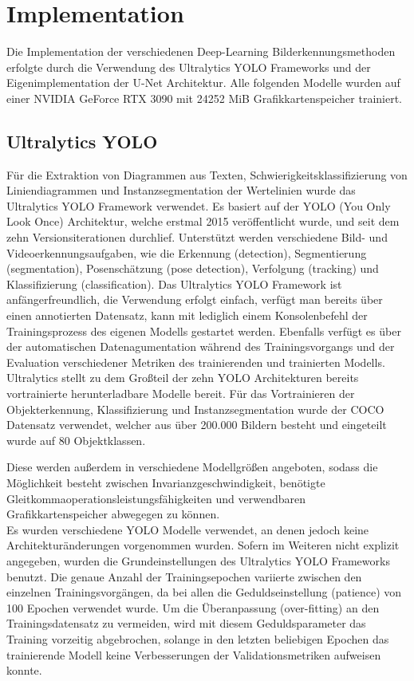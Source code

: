 \chapter{Implementation}
\label{ch:implementation}

Die Implementation der verschiedenen Deep-Learning Bilderkennungsmethoden erfolgte durch die Verwendung des Ultralytics YOLO \cite{Jocher_Ultralytics_YOLO_2023} Frameworks und der Eigenimplementation der U-Net \cite{ronneberger2015unetconvolutionalnetworksbiomedical} Architektur. Alle folgenden Modelle wurden auf einer NVIDIA GeForce RTX 3090 mit 24252 MiB Grafikkartenspeicher trainiert.

\section{Ultralytics YOLO}
Für die Extraktion von Diagrammen aus Texten, Schwierigkeitsklassifizierung von Liniendiagrammen und Instanzsegmentation der Wertelinien wurde das Ultralytics YOLO Framework verwendet. Es basiert auf der YOLO (You Only Look Once) Architektur, welche erstmal 2015 \cite{redmon2016lookonceunifiedrealtime} veröffentlicht wurde, und seit dem zehn Versionsiterationen durchlief. Unterstützt werden verschiedene Bild- und Videoerkennungsaufgaben, wie die Erkennung (detection), Segmentierung (segmentation), Posenschätzung (pose detection), Verfolgung (tracking) und Klassifizierung (classification). Das Ultralytics YOLO Framework ist anfängerfreundlich, die Verwendung erfolgt einfach, verfügt man bereits über einen annotierten Datensatz, kann mit lediglich einem Konsolenbefehl der Trainingsprozess des eigenen Modells gestartet werden. Ebenfalls verfügt es über der automatischen Datenagumentation während des Trainingsvorgangs und der Evaluation verschiedener Metriken des trainierenden und trainierten Modells.
\\
Ultralytics stellt zu dem Großteil der zehn YOLO Architekturen bereits vortrainierte herunterladbare Modelle bereit. Für das Vortrainieren der Objekterkennung, Klassifizierung und Instanzsegmentation wurde der COCO \cite{lin2015microsoftcococommonobjects} Datensatz verwendet, welcher aus über 200.000 Bildern besteht und  eingeteilt wurde auf 80 Objektklassen.

Diese werden außerdem in verschiedene Modellgrößen angeboten, sodass die Möglichkeit besteht zwischen Invarianzgeschwindigkeit, benötigte Gleitkommaoperationsleistungsfähigkeiten und verwendbaren Grafikkartenspeicher abwegegen zu können.
\\
Es wurden verschiedene YOLO Modelle verwendet, an denen jedoch keine Architekturänderungen vorgenommen wurden.
Sofern im Weiteren nicht explizit angegeben, wurden die Grundeinstellungen des Ultralytics YOLO Frameworks benutzt. Die genaue Anzahl der Trainingsepochen variierte zwischen den einzelnen Trainingsvorgängen, da bei allen die Geduldseinstellung (patience) von 100 Epochen verwendet wurde. Um die Überanpassung (over-fitting) an den Trainingsdatensatz zu vermeiden, wird mit diesem Geduldsparameter das Training vorzeitig abgebrochen, solange in den letzten beliebigen Epochen das trainierende Modell keine Verbesserungen der Validationsmetriken aufweisen konnte.

